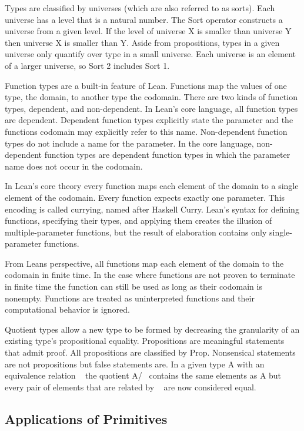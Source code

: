 \documentclass{article}
\newcommand{\1}{\mathbbm{1}}
\theoremstyle{plain}
\theoremstyle{definition}
\numberwithin{equation}{section}
\begin{document}
Types are classified by universes (which are also referred to as sorts). Each universe has a level that is a natural number. The Sort operator constructs a universe from a given level. If the level of universe X is smaller than universe Y then universe X is smaller than Y.  Aside from propositions, types in a given universe only quantify over type in a small universe. Each universe is an element of a larger universe, so Sort 2 includes Sort 1. 

Function types are a built-in feature of Lean. Functions map the values of one type, the domain, to another type the codomain. There are two kinds of function types, dependent, and non-dependent. In Lean’s core language, all function types are dependent. Dependent function types explicitly state the parameter and the functions codomain may explicitly refer to this name. Non-dependent function types do not include a name for the parameter. In the core language, non-dependent function types are dependent function types in which the parameter name does not occur in the codomain.

In Lean’s core theory every function maps each element of the domain to a single element of the codomain. Every function expects exactly one parameter. This encoding is called currying, named after Haskell Curry. Lean's syntax for defining functions, specifying their types, and applying them creates the illusion of multiple-parameter functions, but the result of elaboration contains only single-parameter functions.

From Leans perspective, all functions map each element of the domain to the codomain in finite time. In the case where functions are not proven to terminate in finite time the function can still be used as long as their codomain is nonempty. Functions are treated as uninterpreted functions and their computational behavior is ignored. 

Quotient types allow a new type to be formed by decreasing the granularity of an existing type’s propositional equality. Propositions are meaningful statements that admit proof. All propositions are classified by Prop. Nonsensical statements are not propositions but false statements are. In a given type A with an equivalence relation ~ the quotient A/~ contains the same elements as A but every pair of elements that are related by ~ are now considered equal. 

\subsection{Applications of Primitives}
\end{document}
